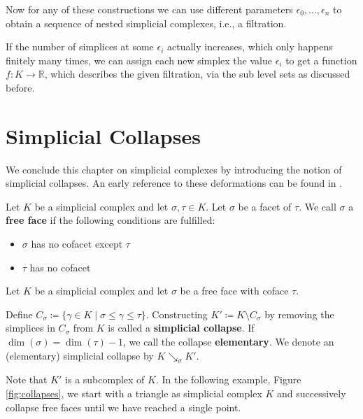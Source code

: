 Now for any of these constructions we can use different parameters $\epsilon_0,\dots,\epsilon_n$ to obtain a sequence of nested simplicial complexes, i.e., a filtration. 

If the number of simplices at some $\epsilon_i$ actually increases, which only happens finitely many times, we can assign each new simplex the value $\epsilon_i$ to get a function $f:K\rightarrow \mathbb{R}$, which describes the given filtration, via the sub level sets as discussed before. 


\section{Simplicial Collapses}
\label{sec:simplicial_collapses}
We conclude this chapter on simplicial complexes by introducing the notion of simplicial collapses. An early reference to these deformations can be found in \cite{whitehead}.

\begin{defi}
Let $K$ be a simplicial complex and let $\sigma,\tau \in K$. Let $\sigma$ be a facet of $\tau$. We call $\sigma$ a \textbf{free face} if the following conditions are fulfilled:
\begin{itemize}
    \item $\sigma$ has no cofacet except $\tau$
    \item $\tau$ has no cofacet
\end{itemize}
\end{defi}

\begin{defi}
Let $K$ be a simplicial complex and let $\sigma$ be a free face with coface $\tau$. 

Define $C_{\sigma} \coloneqq \{\gamma \in K \mid \sigma \leq \gamma \leq \tau\}$. Constructing $K' \coloneqq K \setminus C_{\sigma}$ by removing the simplices in $C_\sigma$ from $K$ is called a \textbf{simplicial collapse}. If $\operatorname{dim}(\sigma) = \operatorname{dim}(\tau)-1$, we call the collapse \textbf{elementary}. We denote an (elementary) simplicial collapse by $K \searrow_{\sigma} K'$.
\end{defi}

Note that $K'$ is a subcomplex of $K$. In the following example, Figure \ref{fig:collapses}, we start with a triangle as simplicial complex $K$ and successively collapse free faces until we have reached a single point.

